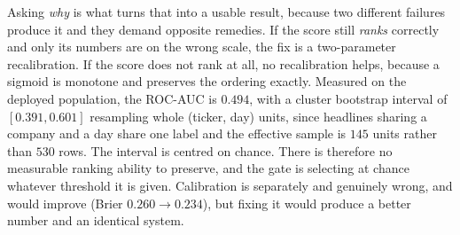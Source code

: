 \begin{itemize}
        Asking \emph{why} is what turns that into a usable result, because two different failures
        produce it and they demand opposite remedies. If the score still \emph{ranks} correctly and
        only its numbers are on the wrong scale, the fix is a two-parameter recalibration. If the
        score does not rank at all, no recalibration helps, because a sigmoid is monotone and
        preserves the ordering exactly. Measured on the deployed population, the ROC-AUC is
        $0.494$, with a cluster bootstrap interval of $[0.391, 0.601]$ resampling whole
        (ticker, day) units, since headlines sharing a company and a day share one label and the
        effective sample is $145$ units rather than $530$ rows. The interval is centred on chance.
        There is therefore no measurable ranking ability to preserve, and the gate is selecting at
        chance whatever threshold it is given. Calibration is separately and genuinely wrong, and
        would improve (Brier $0.260 \to 0.234$), but fixing it would produce a better number and an
        identical system.


\end{itemize}
